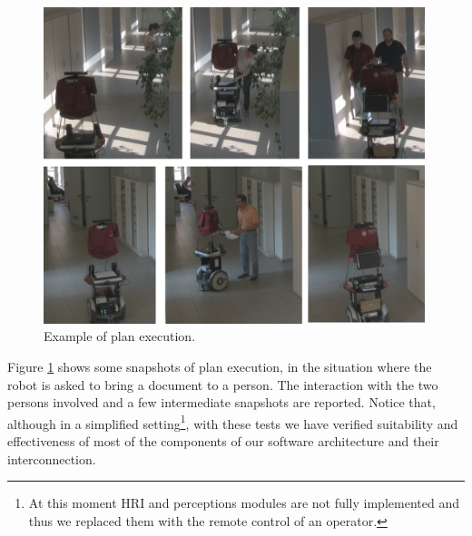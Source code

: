 \begin{figure}[ht]
\centering
\includegraphics[width=0.99\textwidth]{fig/DIAGprinter-demo}
\caption{Example of plan execution.}
\label{fig:DIAGtest}
\end{figure}

Figure \ref{fig:DIAGtest} shows some snapshots of plan execution, in the situation where the robot is asked to bring a document to a person. The interaction with the two persons involved and a few intermediate snapshots are reported.
Notice that, although in a simplified setting\footnote{At this moment HRI and perceptions modules are not fully implemented and thus we replaced them with the remote control of an operator.}, with these tests we have verified suitability and effectiveness of most of the components of our software architecture and their interconnection.


